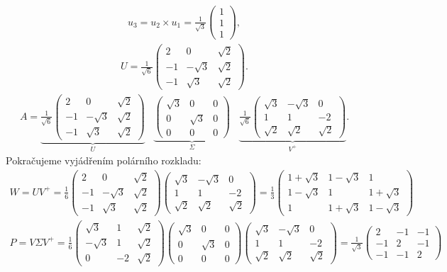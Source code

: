 \documentclass[]{article}
\newcommand{\mat}[1]{\begin{pmatrix}#1\end{pmatrix}}
\newcommand{\recip}[1]{\frac{1}{#1}}
\newcommand{\recipsqrt}[1]{\frac{1}{\sqrt{#1}}}
\newcommand{\x}{\times}
\begin{document}
\begin{align*}
  u_3 = u_2 \x u_1 = \recipsqrt{3} \mat{1\\1\\1},
\end{align*}
\begin{align*}
  U = \recipsqrt{6} \mat{
    2 & 0 & \sqrt{2} \\
    -1 & -\sqrt{3} & \sqrt{2} \\
    -1 & \sqrt{3} & \sqrt{2}
  }.
\end{align*}
\begin{align*}
  A = \underbrace{
    \recipsqrt{6}
    \mat{
      2 & 0 & \sqrt{2} \\
      -1 & -\sqrt{3} & \sqrt{2} \\
      -1 & \sqrt{3} & \sqrt{2}
    }
  }_U
  \;\;\;
  \underbrace{\mat{
    \sqrt{3} & 0 & 0 \\
    0 & \sqrt{3} & 0 \\
    0 & 0 & 0
  }}_\Sigma
  \;\;\;
  \underbrace{
    \recipsqrt{6}
    \mat{
      \sqrt{3} & -\sqrt{3} & 0 \\
      1 & 1 & -2 \\
      \sqrt{2} & \sqrt{2} & \sqrt{2}
    }
  }_{V^+}
  .
\end{align*}
Pokračujeme vyjádřením polárního rozkladu:
\begin{align*}
  W = UV^+ = \recip{6} \mat{
    2 & 0 & \sqrt{2} \\
    -1 & -\sqrt{3} & \sqrt{2} \\
    -1 & \sqrt{3} & \sqrt{2}
  }
  \mat{
    \sqrt{3} & -\sqrt{3} & 0 \\
    1 & 1 & -2 \\
    \sqrt{2} & \sqrt{2} & \sqrt{2}
  }
  =
  \recip{3}
  \mat{
    1+\sqrt{3} & 1-\sqrt{3} & 1 \\
    1-\sqrt{3} & 1 & 1+\sqrt{3} \\
    1 & 1+\sqrt{3} & 1-\sqrt{3}
  }
\end{align*}
\begin{align*}
  P = V \Sigma V^+ =
  \recip{6}
  \mat{
    \sqrt{3} & 1 & \sqrt{2} \\
    -\sqrt{3} & 1 & \sqrt{2} \\
    0 & -2 & \sqrt{2}
  }
  \mat{
    \sqrt{3} & 0 & 0 \\
    0 & \sqrt{3} & 0 \\
    0 & 0 & 0
  }
  \mat{
    \sqrt{3} & -\sqrt{3} & 0 \\
    1 & 1 & -2 \\
    \sqrt{2} & \sqrt{2} & \sqrt{2}
  }
  =
  \recipsqrt{3}
  \mat{
    2 & -1 & -1 \\
    -1 & 2 & -1 \\
    -1 & -1 & 2
  }
\end{align*}
\end{document}
